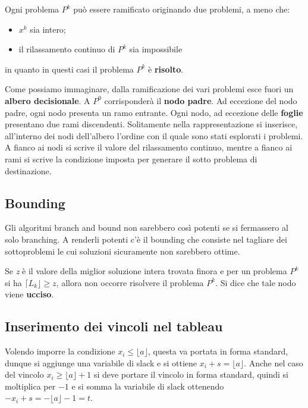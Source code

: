 \documentclass[11pt, oneside]{book}
\begin{document}
\par\bigskip

Ogni problema $P^k$ pu\`o essere ramificato originando due problemi, a
meno che:

\begin{itemize}
\item $x^k$ sia intero;
\item il rilassamento continuo di $P^k$ sia impossibile
\end{itemize}

in quanto in questi casi il problema $P^k$ \`e {\bf risolto}.

\par\bigskip

Come possiamo immaginare, dalla ramificazione dei vari problemi esce
fuori un {\bf albero decisionale}. A $P^0$ corrisponder\`a il {\bf
  nodo padre}. Ad eccezione del nodo padre, ogni nodo presenta un ramo
entrante. Ogni nodo, ad eccezione delle {\bf foglie} presentano due
rami discendenti. Solitamente nella rappresentazione si inserisce,
all'interno dei nodi dell'albero l'ordine con il quale sono stati
esplorati i problemi. A fianco ai nodi si scrive il valore del
rilassamento continuo, mentre a fianco ai rami si scrive la condizione
imposta per generare il sotto problema di destinazione.

\subsection{Bounding}

Gli algoritmi branch and bound non sarebbero cos\`i potenti se si
fermassero al solo branching. A renderli potenti c'\`e il bounding che
consiste nel tagliare dei sottoproblemi le cui soluzioni sicuramente
non sarebbero ottime.

\par\bigskip

Se {\em z} \`e il valore della miglior soluzione intera trovata finora
e per un problema $P^k$ si ha $\lceil L_k \rfloor \geq z$, allora non
occorre risolvere il problema $P^k$. Si dice che tale nodo viene {\bf
  ucciso}.

\subsection{Inserimento dei vincoli nel tableau}

Volendo imporre la condizione $x_i \leq \lfloor a \rfloor$, questa va
portata in forma standard, dunque si aggiunge una variabile di slack e
si ottiene $x_i + s = \lfloor a \rfloor$. Anche nel caso del vincolo
$x_i \geq \lfloor a \rfloor + 1$ si deve portare il vincolo in forma
standard, quindi si moltiplica per $-1$ e si somma la variabile di
slack ottenendo $-x_i + s = -\lfloor a \rfloor - 1 = t$.
\end{document}
